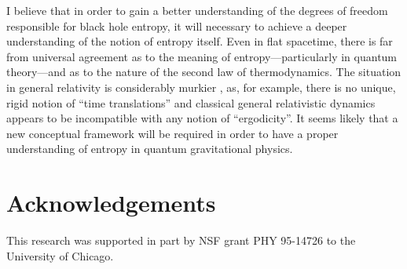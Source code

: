 \documentclass[12pt]{article}
\begin{document}
I believe that in order to gain a better understanding of the degrees
of freedom responsible for black hole entropy, it will necessary to
achieve a deeper understanding of the notion of entropy itself. Even
in flat spacetime, there is far from universal agreement as to the
meaning of entropy---particularly in quantum theory---and as to the
nature of the second law of thermodynamics. The situation in general
relativity is considerably murkier \cite{w2}, as, for example, there
is no unique, rigid notion of ``time translations'' and classical
general relativistic dynamics appears to be incompatible with any
notion of ``ergodicity''.  It seems likely that a new conceptual
framework will be required in order to have a proper understanding of
entropy in quantum gravitational physics.


\section{Acknowledgements}
\label{acknowledgements}

This research was supported in part by NSF grant PHY 95-14726 to the
University of Chicago.
\end{document}
